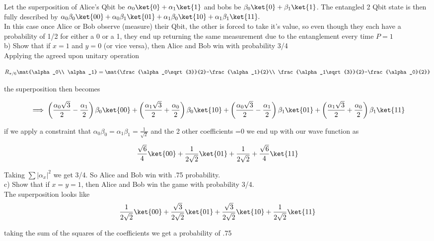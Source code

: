  Let the superposition of Alice's Qbit be $\alpha_0\ket{0}+\alpha_1\ket{1}$
 and bobs be $\beta_0\ket{0}+\beta_1\ket{1}$. The entangled 2 Qbit state is
 then fully described by
 $\alpha_0\beta_0\ket{00}+\alpha_0\beta_1\ket{01}+\alpha_1\beta_0\ket{10}+\alpha_1\beta_1\ket{11}.$\\

 In this case once Alice or Bob observe (measure) their Qbit, the other is
 forced to take it's value, so even though they each have a probability of 1/2
 for either a 0 or a 1, they end up returning the same measurement due to the entanglement every time $P=1$\\

b) Show that if $x=1$ and $y=0$ (or vice versa), then Alice and Bob win with
probability 3/4\\

Applying the agreed upon unitary operation

$$R_{\pi/6}\mat{\alpha_0\\
\alpha_1}=\mat{\frac{\alpha_0\sqrt{3}}{2}-\frac{\alpha_1}{2}\\
\frac{\alpha_1\sqrt{3}}{2}-\frac{\alpha_0}{2}}$$

the superposition then becomes

$$\implies
\left(\frac{\alpha_0\sqrt{3}}{2}-\frac{\alpha_1}{2}\right)\beta_0\ket{00}+\left(\frac{\alpha_1\sqrt{3}}{2}+\frac{\alpha_0}{2}\right)\beta_0\ket{10}+\left(\frac{\alpha_0\sqrt{3}}{2}-\frac{\alpha_1}{2}\right)\beta_1\ket{01}+\left(\frac{\alpha_1\sqrt{3}}{2}+\frac{\alpha_0}{2}\right)\beta_1\ket{11}$$

if we apply a constraint that
$\alpha_0\beta_0=\alpha_1\beta_1=\frac{1}{\sqrt{2}}$ and the 2 other
coefficients =0 we end up with our wave function as

$$\frac{\sqrt{6}}{4}\ket{00}+\frac{1}{2\sqrt{2}}\ket{01}+\frac{1}{2\sqrt{2}}+\frac{\sqrt{6}}{4}\ket{11}$$

Taking $\sum|\alpha_x|^2$ we get 3/4. So Alice and Bob win with .75
probability.\\

c) Show that if $x=y=1$, then Alice and Bob win the game with probability 3/4.\\

The superposition looks like
$$\frac{1}{2\sqrt{2}}\ket{00}+\frac{\sqrt{3}}{2\sqrt{2}}\ket{01}+\frac{\sqrt{3}}{2\sqrt{2}}\ket{10}+\frac{1}{2\sqrt{2}}\ket{11}$$

taking the sum of the squares of the coefficients we get a probability of .75\\

